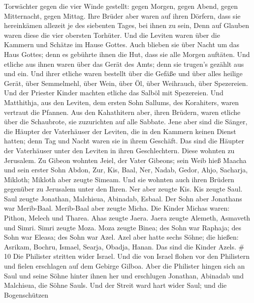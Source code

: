 Torwächter gegen die vier Winde gestellt: gegen Morgen, gegen Abend,
gegen Mitternacht, gegen Mittag.  Ihre Brüder aber waren
auf ihren Dörfern, dass sie hereinkämen allezeit je des siebenten Tages,
bei ihnen zu sein,  Denn auf Glauben waren diese die vier
obersten Torhüter. Und die Leviten waren über die Kammern und Schätze im
Hause Gottes.  Auch blieben sie über Nacht um das Haus
Gottes; denn es gebührte ihnen die Hut, dass sie alle Morgen auftäten.
 Und etliche aus ihnen waren über das Gerät des Amts; denn
sie trugen's gezählt aus und ein.  Und ihrer etliche waren
bestellt über die Gefäße und über alles heilige Gerät, über Semmelmehl,
über Wein, über Öl, über Weihrauch, über Spezereien.  Und
der Priester Kinder machten etliche das Salböl mit Spezereien.
 Und Matthithja, aus den Leviten, dem ersten Sohn Sallums,
des Korahiters, waren vertraut die Pfannen.  Aus den
Kahathitern aber, ihren Brüdern, waren etliche über die Schaubrote, sie
zuzurichten auf alle Sabbate.  Jene aber sind die Sänger,
die Häupter der Vaterhäuser der Leviten, die in den Kammern keinen
Dienst hatten; denn Tag und Nacht waren sie in ihrem Geschäft.
 Das sind die Häupter der Vaterhäuser unter den Leviten in
ihren Geschlechtern. Diese wohnten zu Jerusalem.  Zu Gibeon
wohnten Jeiel, der Vater Gibeons; sein Weib hieß Maacha 
und sein erster Sohn Abdon, Zur, Kis, Baal, Ner, Nadab, 
Gedor, Ahjo, Sacharja, Mikloth;  Mikloth aber zeugte
Simeam. Und sie wohnten auch ihren Brüdern gegenüber zu Jerusalem unter
den Ihren.  Ner aber zeugte Kis. Kis zeugte Saul. Saul
zeugte Jonathan, Malchisua, Abinadab, Esbaal.  Der Sohn
aber Jonathans war Merib-Baal. Merib-Baal aber zeugte Micha.
 Die Kinder Michas waren: Pithon, Melech und Tharea.
 Ahas zeugte Jaera. Jaera zeugte Alemeth, Asmaveth und
Simri. Simri zeugte Moza.  Moza zeugte Binea; des Sohn war
Raphaja; des Sohn war Eleasa; des Sohn war Azel.  Azel aber
hatte sechs Söhne; die hießen: Asrikam, Bochru, Ismael, Searja, Obadja,
Hanan. Das sind die Kinder Azels. \# 10  Die Philister
stritten wider Israel. Und die von Israel flohen vor den Philistern und
fielen erschlagen auf dem Gebirge Gilboa.  Aber die
Philister hingen sich an Saul und seine Söhne hinter ihnen her und
erschlugen Jonathan, Abinadab und Malchisua, die Söhne Sauls.
 Und der Streit ward hart wider Saul; und die Bogenschützen
